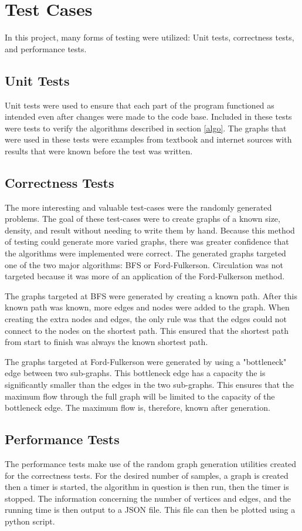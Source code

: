 \documentclass[conference]{IEEEtran}
\begin{document}
\section{Test Cases}
In this project, many forms of testing were utilized: Unit tests, correctness tests,
and performance tests.

\subsection{Unit Tests}
Unit tests were used to ensure that each part of the program functioned as intended even after
changes were made to the code base. Included in these tests were tests to verify the algorithms
described in section \ref{algo}. The graphs that were used in these tests were examples from 
textbook and internet sources with results that were known before the test was written. 

\subsection{Correctness Tests}
The more interesting and valuable test-cases were the randomly generated problems. The goal
of these test-cases were to create graphs of a known size, density, and result without needing
to write them by hand. Because this method of testing could generate more varied graphs, there 
was greater confidence that the algorithms were implemented were correct. The generated graphs 
targeted one of the two major algorithms: BFS or Ford-Fulkerson. Circulation was not targeted
because it was more of an application of the Ford-Fulkerson method.

The graphs targeted at BFS were generated by creating a known path. After this known path was
known, more edges and nodes were added to the graph. When creating the extra nodes and edges, 
the only rule was that the edges could not connect to the nodes on the shortest path. This 
ensured that the shortest path from start to finish was always the known shortest path. 

The graphs targeted at Ford-Fulkerson were generated by using a "bottleneck" edge between 
two sub-graphs. This bottleneck edge has a capacity the is significantly smaller than the 
edges in the two sub-graphs. This ensures that the maximum flow through the full graph
will be limited to the capacity of the bottleneck edge. The maximum flow is, therefore, 
known after generation.

\subsection{Performance Tests}\label{perf_explanation} %
The performance tests make use of the random graph generation utilities created for the 
correctness tests. For the desired number of samples, a graph is created then a timer is
started, the algorithm in question is then run, then the timer is stopped. The information
concerning the number of vertices and edges, and the running time is then output to a 
JSON file. This file can then be plotted using a python script. 
\end{document}
